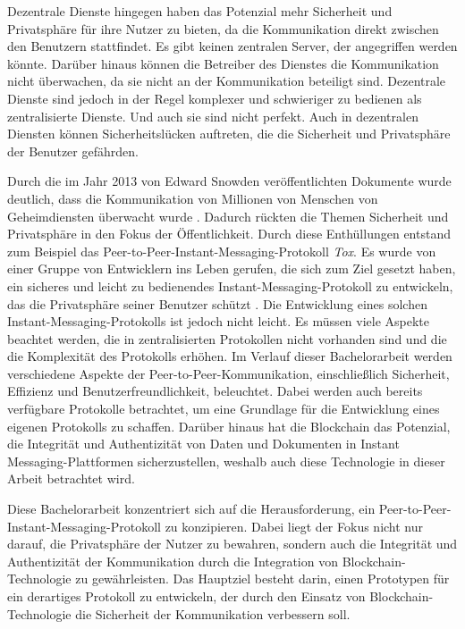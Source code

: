 Dezentrale Dienste hingegen haben das Potenzial mehr Sicherheit und Privatsphäre für ihre Nutzer zu bieten, da die Kommunikation direkt zwischen den Benutzern stattfindet. Es gibt keinen zentralen Server, der angegriffen werden könnte. Darüber hinaus können die Betreiber des Dienstes die Kommunikation nicht überwachen, da sie nicht an der Kommunikation beteiligt sind. Dezentrale Dienste sind jedoch in der Regel komplexer und schwieriger zu bedienen als zentralisierte Dienste. Und auch sie sind nicht perfekt. Auch in dezentralen Diensten können Sicherheitslücken auftreten, die die Sicherheit und Privatsphäre der Benutzer gefährden.


Durch die im Jahr 2013 von Edward Snowden veröffentlichten Dokumente wurde deutlich, dass die Kommunikation von Millionen von Menschen von Geheimdiensten überwacht wurde \parencite{greenwald_NSA}. Dadurch rückten die Themen Sicherheit und Privatsphäre in den Fokus der Öffentlichkeit. Durch diese Enthüllungen entstand zum Beispiel das Peer-to-Peer-Instant-Messaging-Protokoll \textit{Tox}. Es wurde von einer Gruppe von Entwicklern ins Leben gerufen, die sich zum Ziel gesetzt haben, ein sicheres und leicht zu bedienendes Instant-Messaging-Protokoll zu entwickeln, das die Privatsphäre seiner Benutzer schützt \parencite{tox_about}. Die Entwicklung eines solchen Instant-Messaging-Protokolls ist jedoch nicht leicht. Es müssen viele Aspekte beachtet werden, die in zentralisierten Protokollen nicht vorhanden sind und die die Komplexität des Protokolls erhöhen. Im Verlauf dieser Bachelorarbeit werden verschiedene Aspekte der Peer-to-Peer-Kommunikation, einschließlich Sicherheit, Effizienz und Benutzerfreundlichkeit, beleuchtet. Dabei werden auch bereits verfügbare Protokolle betrachtet, um eine Grundlage für die Entwicklung eines eigenen Protokolls zu schaffen. Darüber hinaus hat die Blockchain das Potenzial, die Integrität und Authentizität von Daten und Dokumenten in Instant Messaging-Plattformen sicherzustellen, weshalb auch diese Technologie in dieser Arbeit betrachtet wird.

Diese Bachelorarbeit konzentriert sich auf die Herausforderung, ein Peer-to-Peer-Instant-Messaging-Protokoll zu konzipieren. Dabei liegt der Fokus nicht nur darauf, die Privatsphäre der Nutzer zu bewahren, sondern auch die Integrität und Authentizität der Kommunikation durch die Integration von Blockchain-Technologie zu gewährleisten. Das Hauptziel besteht darin, einen Prototypen für ein derartiges Protokoll zu entwickeln, der durch den Einsatz von Blockchain-Technologie die Sicherheit der Kommunikation verbessern soll.
